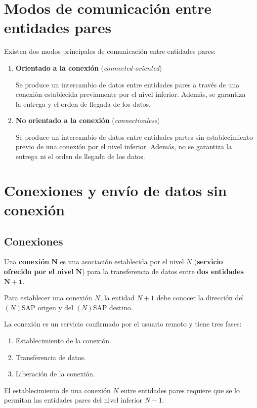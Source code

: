 \documentclass[a4paper]{book}
\begin{document}
\section{Modos de comunicación entre entidades pares}
Existen dos modos principales de comunicación entre entidades pares:
\begin{enumerate}
  \item \textbf{Orientado a la conexión} (\textsl{connected-oriented})

        Se produce un intercambio de datos entre entidades pares a través de una conexión establecida previamente por el nivel inferior. Además, se garantiza la entrega y el orden de llegada de los datos.
  \item \textbf{No orientado a la conexión} (\textsl{connectionless})

        Se produce un intercambio de datos entre entidades partes sin establecimiento previo de una conexión por el nivel inferior. Además, no se garantiza la entrega ni el orden de llegada de los datos.
\end{enumerate}

\section{Conexiones y envío de datos sin conexión}

\subsection{Conexiones}
Una \textbf{conexión} $\mathbf{N}$ es una asociación establecida por el nivel $N$ (\textbf{servicio ofrecido por el nivel} $\mathbf{N}$) para la transferencia de datos entre \textbf{dos entidades} $\mathbf{N+1}$.

Para establecer una conexión $N$, la entidad $N+1$ debe conocer la dirección del $(N)$SAP origen y del $(N)$SAP destino.

La conexión es un servicio confirmado por el usuario remoto y tiene tres fases:
\begin{enumerate}
  \item Establecimiento de la conexión.
  \item Transferencia de datos.
  \item Liberación de la conexión.
\end{enumerate}

El establecimiento de una conexión $N$ entre entidades pares requiere que se lo permitan las entidades pares del nivel inferior $N-1$.
\end{document}
